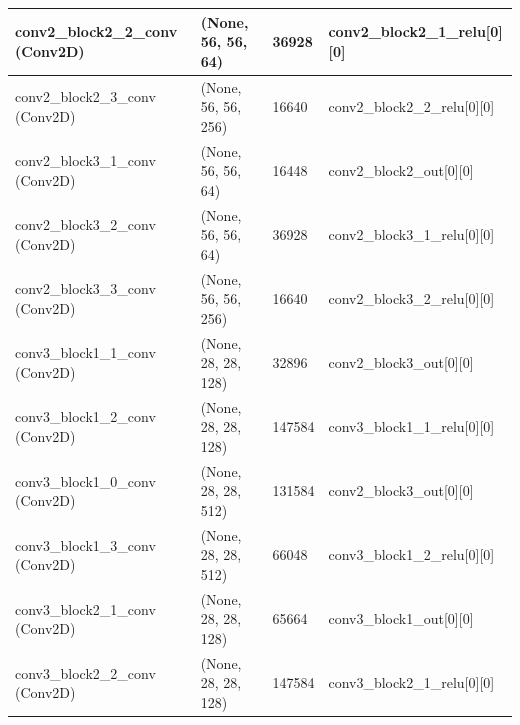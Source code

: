 \documentclass[12pt,oneside,geqno]{article}
\begin{document}
\begin{table}[]
{\begin{tabular}{llll}
				\multicolumn{1}{|l|}{conv2\_block2\_2\_conv (Conv2D)}  & \multicolumn{1}{l|}{(None, 56, 56, 64)}   & \multicolumn{1}{l|}{36928}   & \multicolumn{1}{l|}{conv2\_block2\_1\_relu{[}0{]}{[}0{]}} \\ \hline
				\multicolumn{1}{|l|}{conv2\_block2\_3\_conv (Conv2D)}  & \multicolumn{1}{l|}{(None, 56, 56, 256)}  & \multicolumn{1}{l|}{16640}   & \multicolumn{1}{l|}{conv2\_block2\_2\_relu{[}0{]}{[}0{]}} \\ \hline
				\multicolumn{1}{|l|}{conv2\_block3\_1\_conv (Conv2D)}  & \multicolumn{1}{l|}{(None, 56, 56, 64)}   & \multicolumn{1}{l|}{16448}   & \multicolumn{1}{l|}{conv2\_block2\_out{[}0{]}{[}0{]}}     \\ \hline
				\multicolumn{1}{|l|}{conv2\_block3\_2\_conv (Conv2D)}  & \multicolumn{1}{l|}{(None, 56, 56, 64)}   & \multicolumn{1}{l|}{36928}   & \multicolumn{1}{l|}{conv2\_block3\_1\_relu{[}0{]}{[}0{]}} \\ \hline
				\multicolumn{1}{|l|}{conv2\_block3\_3\_conv (Conv2D)}  & \multicolumn{1}{l|}{(None, 56, 56, 256)}  & \multicolumn{1}{l|}{16640}   & \multicolumn{1}{l|}{conv2\_block3\_2\_relu{[}0{]}{[}0{]}} \\ \hline
				\multicolumn{1}{|l|}{conv3\_block1\_1\_conv (Conv2D)}  & \multicolumn{1}{l|}{(None, 28, 28, 128)}  & \multicolumn{1}{l|}{32896}   & \multicolumn{1}{l|}{conv2\_block3\_out{[}0{]}{[}0{]}}     \\ \hline
				\multicolumn{1}{|l|}{conv3\_block1\_2\_conv (Conv2D)}  & \multicolumn{1}{l|}{(None, 28, 28, 128)}  & \multicolumn{1}{l|}{147584}  & \multicolumn{1}{l|}{conv3\_block1\_1\_relu{[}0{]}{[}0{]}} \\ \hline
				\multicolumn{1}{|l|}{conv3\_block1\_0\_conv (Conv2D)}  & \multicolumn{1}{l|}{(None, 28, 28, 512)}  & \multicolumn{1}{l|}{131584}  & \multicolumn{1}{l|}{conv2\_block3\_out{[}0{]}{[}0{]}}     \\ \hline
				\multicolumn{1}{|l|}{conv3\_block1\_3\_conv (Conv2D)}  & \multicolumn{1}{l|}{(None, 28, 28, 512)}  & \multicolumn{1}{l|}{66048}   & \multicolumn{1}{l|}{conv3\_block1\_2\_relu{[}0{]}{[}0{]}} \\ \hline
				\multicolumn{1}{|l|}{conv3\_block2\_1\_conv (Conv2D)}  & \multicolumn{1}{l|}{(None, 28, 28, 128)}  & \multicolumn{1}{l|}{65664}   & \multicolumn{1}{l|}{conv3\_block1\_out{[}0{]}{[}0{]}}     \\ \hline
				\multicolumn{1}{|l|}{conv3\_block2\_2\_conv (Conv2D)}  & \multicolumn{1}{l|}{(None, 28, 28, 128)}  & \multicolumn{1}{l|}{147584}  & \multicolumn{1}{l|}{conv3\_block2\_1\_relu{[}0{]}{[}0{]}} \\ \hline

\end{tabular}}
\end{table}
\end{document}
